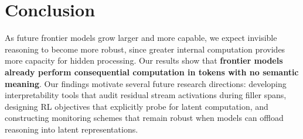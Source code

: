 \documentclass{article}
\begin{document}

\section{Conclusion}
As future frontier models grow larger and more capable, we expect invisible reasoning to become more robust, since greater internal computation provides more capacity for hidden processing. Our results show that \textbf{frontier models already perform consequential computation in tokens with no semantic meaning}. Our findings motivate several future research directions: developing interpretability tools that audit residual stream activations during filler spans, designing RL objectives that explicitly probe for latent computation, and constructing monitoring schemes that remain robust when models can offload reasoning into latent representations.
\end{document}
